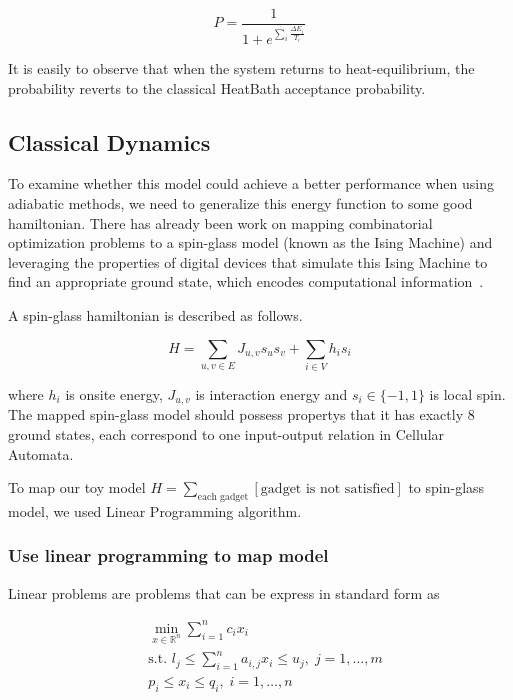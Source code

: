 \documentclass[twocolumn,superscriptaddress,english,showpacs,longbibliography]{revtex4-2}
\begin{document}
\begin{equation}
P = \frac{1}{1 + e^{\sum_i \frac{\Delta E_i}{T_i}}}
\end{equation}

It is easily to observe that when the system returns to
heat-equilibrium, the probability reverts to the classical HeatBath
acceptance probability.

\subsection{Classical Dynamics}\label{classical-dynamics}

To examine whether this model could achieve a better performance when
using adiabatic methods, we need to generalize this energy function to
some good hamiltonian. There has already been work on mapping
combinatorial optimization problems to a spin-glass model (known as the
Ising Machine) and leveraging the properties of digital devices that
simulate this Ising Machine to find an appropriate ground state, which
encodes computational information~\cite{Aadit2022,Bybee2023}.

A spin-glass hamiltonian is described as follows.

\begin{equation}
H = \sum_{u,v \in E} J_{u,v}s_us_v + \sum_{i\in V}h_i s_i
\end{equation}

where $h_i$ is onsite energy, $J_{u,v}$ is interaction energy and
$s_i \in \{-1, 1\}$ is local spin. The mapped spin-glass model should
possess propertys that it has exactly 8 ground states, each correspond
to one input-output relation in Cellular Automata.

To map our toy model
$H = \sum_{\text{each gadget}} [\text{gadget is not satisfied}]$ to
spin-glass model, we used Linear Programming algorithm.

\subsubsection{Use linear programming to map
model}\label{use-linear-programming-to-map-model}

Linear problems are problems that can be express in standard form as

\begin{equation}
    \begin{split}
        &\min_{x \in \mathbb{R}^n} \sum_{i=1}^n c_ix_i\\
        &\text{s.t. } l_j \leq \sum_{i=1}^n a_{i,j}x_i \leq u_j, \; j=1,\ldots,m\\
        &p_i \leq x_i \leq q_i, \; i=1,\ldots, n
    \end{split}
\end{equation}
\end{document}
